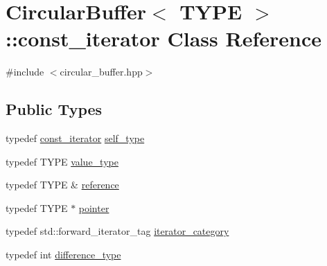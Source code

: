 \hypertarget{classCircularBuffer_1_1const__iterator}{}\section{Circular\+Buffer$<$ T\+Y\+PE $>$\+:\+:const\+\_\+iterator Class Reference}
\label{classCircularBuffer_1_1const__iterator}


{\ttfamily \#include $<$circular\+\_\+buffer.\+hpp$>$}

\subsection*{Public Types}
\begin{DoxyCompactItemize}
\item 
typedef \hyperlink{classCircularBuffer_1_1const__iterator}{const\+\_\+iterator} \hyperlink{classCircularBuffer_1_1const__iterator_a41a9fc607fc6af770334044799fdbe6b}{self\+\_\+type}
\item 
typedef T\+Y\+PE \hyperlink{classCircularBuffer_1_1const__iterator_a09a25d6aa06aafec6758f94ce15a86a6}{value\+\_\+type}
\item 
typedef T\+Y\+PE \& \hyperlink{classCircularBuffer_1_1const__iterator_a5e8717f5d13ea32a69b990ac7aa9d863}{reference}
\item 
typedef T\+Y\+PE $\ast$ \hyperlink{classCircularBuffer_1_1const__iterator_a037695795b1f705608755121fc938200}{pointer}
\item 
typedef std\+::forward\+\_\+iterator\+\_\+tag \hyperlink{classCircularBuffer_1_1const__iterator_a7ffc902e92a9b5bb1cf7ee67f05c526f}{iterator\+\_\+category}
\item 
typedef int \hyperlink{classCircularBuffer_1_1const__iterator_a7e73630b408821689efae19d7d9d2dcd}{difference\+\_\+type}
\end{DoxyCompactItemize}
